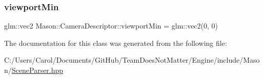 \hypertarget{class_mason_1_1_camera_descriptor_a2d135d0102e435f15cf6a9dde7d64b25}{}\label{class_mason_1_1_camera_descriptor_a2d135d0102e435f15cf6a9dde7d64b25} 
\subsubsection{\texorpdfstring{viewport\+Min}{viewportMin}}
{\footnotesize\ttfamily glm\+::vec2 Mason\+::\+Camera\+Descriptor\+::viewport\+Min = glm\+::vec2(0, 0)}



The documentation for this class was generated from the following file\+:\begin{DoxyCompactItemize}
\item 
C\+:/\+Users/\+Carol/\+Documents/\+Git\+Hub/\+Team\+Does\+Not\+Matter/\+Engine/include/\+Mason/\hyperlink{_scene_parser_8hpp}{Scene\+Parser.\+hpp}\end{DoxyCompactItemize}
